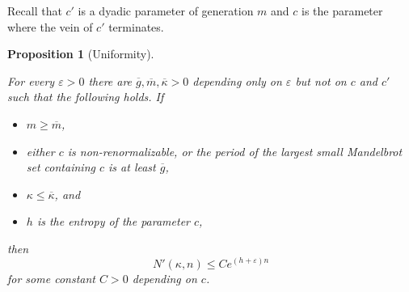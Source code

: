 \documentclass[12pt]{amsart}
\newcommand{\0}{\texttt{0}}
\newcommand{\1}{\texttt{1}}
\newcommand\eps{\varepsilon}
\newtheorem{proposition}[theorem]{Proposition}
\theoremstyle{definition}
\numberwithin{equation}{section}
\newcommand{\ovl}[1]{\overline{#1}}
\newcommand{\lineclear}{\rule{0pt}{2pt}\newline}
\begin{document}

{Recall that $c'$ is a dyadic parameter of generation $m$ and $c$ is the parameter where the vein of $c'$ terminates. }

\begin{proposition}[Uniformity]
\label{prop:Uniformity}\lineclear
For every $\varepsilon >0$ there are $\overline g, \overline m, \ovl\kappa>0$ depending only on $\varepsilon$ but not on $c$ and $c'$ such that the following holds. If 
\begin{itemize}
\item $m\ge \overline m$, 
\item either $c$ is non-renormalizable, or the period of the largest small Mandelbrot set containing $c$ is at least $\overline g$, 
\item $\kappa\le \ovl \kappa$, and
\item $h$ is the entropy of the parameter $c$,
\end{itemize}
then
\[
N'(\kappa,n)\le C e^{(h+\eps)n}  %
\]
for some constant $C>0$ depending on $c$.
\end{proposition}
\end{document}
